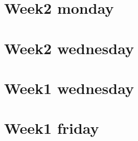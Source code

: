 
\section*{Week2 monday}

\vfill
\section*{Week2 wednesday}

\vfill
\section*{Week1 wednesday}

\vfill
\section*{Week1 friday}

\vfill
